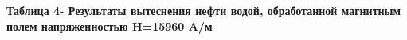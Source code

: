 {{%

{\bfseries Таблица 4- Результаты вытеснения нефти водой, обработанной
магнитным полем напряженностью H=15960 A/м}

}}
